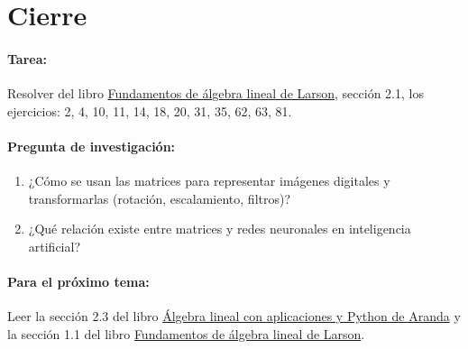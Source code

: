 \documentclass[a4,11pt]{aleph-notas}
\begin{document}
\section*{Cierre}  

\paragraph{Tarea:}  
Resolver del libro \href{https://catalogobiblioteca.puce.edu.ec/cgi-bin/koha/opac-detail.pl?biblionumber=86081}{Fundamentos de álgebra lineal de Larson}, sección 2.1, los ejercicios: 2, 4, 10, 11, 14, 18, 20, 31, 35, 62, 63, 81.

\paragraph{Pregunta de investigación:}  
\begin{enumerate}[leftmargin=*]  
    \item ¿Cómo se usan las matrices para representar imágenes digitales y transformarlas (rotación, escalamiento, filtros)?
    \item ¿Qué relación existe entre matrices y redes neuronales en inteligencia artificial?
\end{enumerate}  

\paragraph{Para el próximo tema:}  
Leer la sección 2.3 del libro \href{https://catalogobiblioteca.puce.edu.ec/cgi-bin/koha/opac-detail.pl?biblionumber=283260}{Álgebra lineal con aplicaciones y Python de Aranda} y la sección 1.1 del libro \href{https://catalogobiblioteca.puce.edu.ec/cgi-bin/koha/opac-detail.pl?biblionumber=86081}{Fundamentos de álgebra lineal de Larson}.
\end{document}
